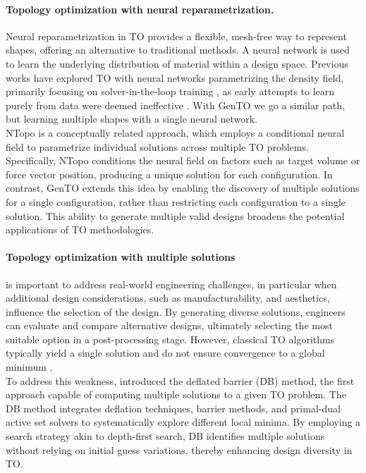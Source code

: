 \paragraph{Topology optimization with neural reparametrization.}
Neural reparametrization in TO provides a flexible, mesh-free way to represent shapes, offering an alternative to traditional methods.
A neural network is used to learn the underlying distribution of material within a design space.
Previous works have explored TO with neural networks parametrizing the density field, primarily focusing on solver-in-the-loop training \citep{gillhofer2019gan, Bujny_TO_reparametrization, Chandrasekhar21tounn, Hoyer2019NeuralRI}, as early attempts to learn purely from data were deemed ineffective \citep{sosnovik_neural_2017}.
With GenTO we go a similar path, but learning multiple shapes with a single neural network.
\\
NTopo \citep{Zehnder21ntopo} is a conceptually related approach, which employs a conditional neural field to parametrize individual solutions across multiple TO problems. 
Specifically, NTopo conditions the neural field on factors such as target volume or force vector position, producing a unique solution for each configuration.
In contrast, GenTO extends this idea by enabling the discovery of multiple solutions for a single configuration, rather than restricting each configuration to a single solution. 
This ability to generate multiple valid designs broadens the potential applications of TO methodologies.



\paragraph{Topology optimization with multiple solutions} is important to address real-world engineering challenges, in particular when additional design considerations, such as manufacturability, and aesthetics, influence the selection of the design. 
By generating diverse solutions, engineers can evaluate and compare alternative designs, ultimately selecting the most suitable option in a post-processing stage.
However, classical TO algorithms typically yield a single solution and do not ensure convergence to a global minimum \citep{multi_TO_Papadopoulos_2021}. 
\\
To address this weakness, \citet{multi_TO_Papadopoulos_2021} introduced the deflated barrier (DB) method, the first approach capable of computing multiple solutions to a given TO problem. 
The DB method integrates deflation techniques, barrier methods, and primal-dual active set solvers to systematically explore different local minima. 
By employing a search strategy akin to depth-first search, DB identifies multiple solutions without relying on initial guess variations, thereby enhancing design diversity in TO.














